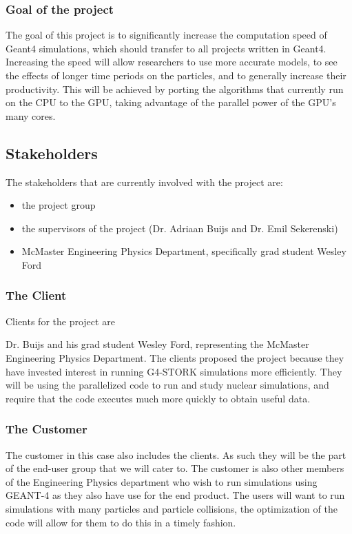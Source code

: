 \documentclass[12pt]{article}
\newcommand{\todo}[1]{\textcolor{red}{[TODO: #1]}} \else
\newcommand{\authornote}[3]{} \newcommand{\todo}[1]{} \fi
\newcommand{\ds}[1]{\authornote{blue}{DS}{#1}} %
\newcommand{\mmp}[1]{\authornote{green}{MP}{#1}}
\begin{document}
\subsubsection{Goal of the project}
The goal of this project is to significantly increase the computation speed of Geant4 simulations, which should transfer to all projects written in Geant4. Increasing the speed will allow researchers to use more accurate models, to see the effects of longer time periods on the particles, and to generally increase their productivity. This will be achieved by porting the algorithms that currently run on the CPU to the GPU, taking advantage of the parallel power of the GPU's many cores.

\subsection{Stakeholders}\label{SubSec_Stakeholders} %
The stakeholders that are currently involved with the project are:
\begin{itemize}
\item the project group
\item the supervisors of the project (Dr. Adriaan Buijs and Dr. Emil Sekerenski)
\item McMaster Engineering Physics Department, specifically grad student Wesley Ford
\end{itemize}

\subsubsection{The Client}
Clients for the project are
\ds{Unnecessary ``the"}\mmp{Fixed}
Dr. Buijs and his grad student Wesley Ford, representing the McMaster Engineering Physics Department. The clients proposed the project because they have invested interest in running G4-STORK simulations more efficiently. They will be using the parallelized code to run and study nuclear simulations, and require that the code executes much more quickly to obtain useful data.
	
\subsubsection{The Customer}
The customer in this case also includes the clients. As such they will be the part of the end-user group that we will cater to.
The customer is also other members of the Engineering Physics department who wish to run simulations using GEANT-4 as they also have use for the end product. The users will want to run simulations with many particles and particle collisions, the optimization of the code will allow for them to do this in a timely fashion.
	
\end{document}
